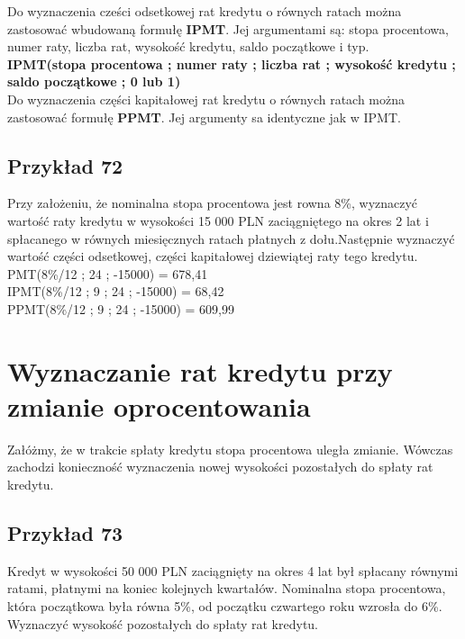 \documentclass{article}
\begin{document}
Do wyznaczenia cześci odsetkowej rat kredytu o równych ratach można zastosować wbudowaną formułę \textbf{IPMT}. Jej argumentami są: stopa procentowa, numer raty, liczba rat, wysokość kredytu, saldo początkowe i typ.\\

\textbf{IPMT(stopa  procentowa ; numer raty ; liczba rat ; wysokość kredytu ; saldo początkowe ; 0 lub 1)}\\

Do wyznaczenia części kapitałowej rat kredytu o równych ratach można zastosować formułę \textbf{PPMT}. Jej argumenty sa identyczne jak w IPMT.\\

\subsection{Przykład 72}
Przy założeniu, że nominalna stopa procentowa jest rowna 8\%, wyznaczyć wartość raty kredytu w wysokości 15 000 PLN zaciągniętego na okres 2 lat i spłacanego w równych miesięcznych ratach płatnych z dołu.Następnie wyznaczyć wartość części odsetkowej, części kapitałowej dziewiątej raty tego kredytu.\\

PMT(8\%/12 ; 24 ; -15000) = 678,41\\

IPMT(8\%/12 ; 9 ; 24 ; -15000) = 68,42\\

PPMT(8\%/12 ; 9 ; 24 ; -15000) = 609,99\\

\newpage

\section{Wyznaczanie rat kredytu przy zmianie oprocentowania}

Załóżmy, że w trakcie spłaty kredytu stopa procentowa uległa zmianie. Wówczas zachodzi konieczność wyznaczenia nowej wysokości pozostałych do spłaty rat kredytu. \\

\subsection{Przykład 73}

Kredyt w wysokości 50 000 PLN zaciągnięty na okres 4 lat był spłacany równymi ratami, płatnymi na koniec kolejnych kwartałów. Nominalna stopa procentowa, która początkowa była równa 5\%, od początku czwartego roku wzrosła do 6\%. Wyznaczyć wysokość pozostałych do spłaty rat kredytu.\\
\end{document}
